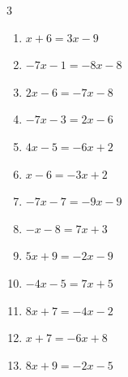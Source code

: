 \begin{multicols}{3}
\begin{enumerate}

  \item $x+6=3x-9$


  \item $-7x-1=-8x-8$

        \phantom{$\displaystyle x=-7$}

  \item $2x-6=-7x-8$


  \item $-7x-3=2x-6$


  \item $4x-5=-6x+2$


  \item $x-6=-3x+2$

        \phantom{$\displaystyle x=2$}

  \item $-7x-7=-9x-9$

        \phantom{$\displaystyle x=-1$}

  \item $-x-8=7x+3$


  \item $5x+9=-2x-9$


  \item $-4x-5=7x+5$


  \item $8x+7=-4x-2$


\columnbreak %

\resetques

  \item $x+7=-6x+8$


  \item $8x+9=-2x-5$



\end{enumerate}
\end{multicols}
